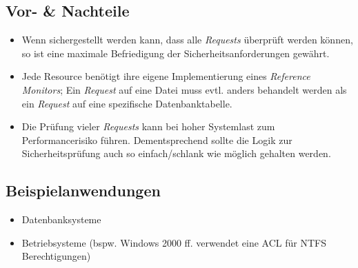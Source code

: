 \subsection*{Vor- \& Nachteile}
\begin{itemize}
	\item Wenn sichergestellt werden kann, dass alle \emph{Requests} überprüft werden können, so ist eine maximale Befriedigung der Sicherheitsanforderungen gewährt.
	\item Jede Resource benötigt ihre eigene Implementierung eines \emph{Reference Monitors}; Ein \emph{Request} auf eine Datei muss evtl. anders behandelt werden als ein \emph{Request} auf eine spezifische Datenbanktabelle.
	\item Die Prüfung vieler \emph{Requests} kann bei hoher Systemlast zum Performancerisiko führen. Dementsprechend sollte die Logik zur Sicherheitsprüfung auch so einfach/schlank wie möglich gehalten werden.
\end{itemize}

\subsection*{Beispielanwendungen}
\begin{itemize}
	\item Datenbanksysteme
	\item Betriebsysteme (bspw. Windows 2000 ff. verwendet eine ACL für NTFS Berechtigungen)
\end{itemize}